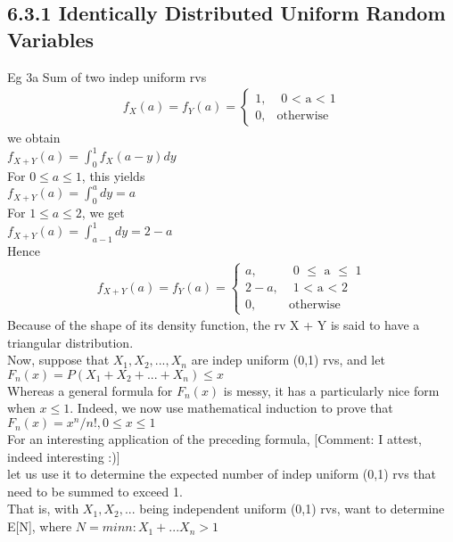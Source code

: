 \documentclass{article}
\begin{document}
\subsection*{6.3.1 Identically Distributed Uniform Random Variables}
Eg 3a Sum of two indep uniform rvs \\
\begin{align*}
    f_X(a) = f_Y(a) = \begin{cases}
                        1, & \text{ 0 < a < 1} \\
                        0, & \text{otherwise}
                      \end{cases}
\end{align*}
we obtain \\
$f_{X+Y}(a) = \int_{0}^1f_X(a-y)dy$\\
For $0 \leq a \leq 1$, this yields \\
$f_{X+Y}(a) = \int_{0}^a dy = a$\\
For $1 \leq a \leq 2$, we get \\
$f_{X+Y}(a) = \int_{a-1}^1 dy = 2 - a$\\
Hence 
\begin{align*}
    f_{X+Y}(a)  = f_Y(a) = \begin{cases}
                        a, & \text{ 0 $\leq$ a $\leq$ 1} \\
                        2 - a, & \text{ 1 < a < 2} \\
                        0, & \text{otherwise}
                      \end{cases}
\end{align*}
Because of the shape of its density function, the rv X + Y is said to have a triangular distribution. \\
Now, suppose that $X_1, X_2, ..., X_n$ are indep uniform (0,1) rvs, and let \\
$F_n(x) = P(X_1 + X_2 + ... + X_n) \leq x$ \\
Whereas a general formula for $F_n(x)$ is messy, it has a particularly nice form when $x \leq 1$. Indeed, we now use mathematical induction to prove that \\ 
$F_n(x) = x^n/n!, 0 \leq x \leq 1$ \\ 
For an interesting application of the preceding formula, [Comment: I attest, indeed interesting :)] \\ 
let us use it to determine the expected number of indep uniform (0,1) rvs that need to be summed to exceed 1. \\
That is, with $X_1, X_2, ...$ being independent uniform (0,1) rvs, want to determine E[N], where $N = min{n: X_1 + ...  X_n >1}$\\
\end{document}
